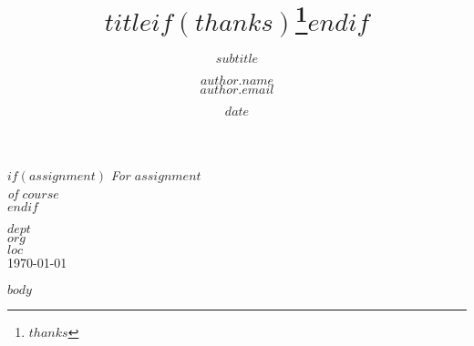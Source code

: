 \documentclass[12pt, letterpaper, twoside]{article}
\title{\vspace{3.0cm}$title$$if(thanks)$\thanks{$thanks$}$endif$}
\subtitle{$subtitle$}
\author{{$author.name$} \\[0.5cm]
{\normalsize $author.email$}}
\date{$date$}
\begin{document}
\setcounter{secnumdepth}{0}

\begin{titlepage}

\maketitle

\vfill
\vfill
\vfill
\vfill

\begin{center}

$if(assignment)$
\large \textit{For $assignment$}\\[0.3cm]
\large \textit{of $course$}\\
$endif$

\vfill

{\normalsize $dept$}\\[0.2cm]
{\normalsize $org$}\\[0.2cm]
{\normalsize $loc$}\\[1cm]

{\large \today}\\[2cm] %
 

\end{center}

\end{titlepage}

$body$

\newpage

\printbibliography
\end{document}
